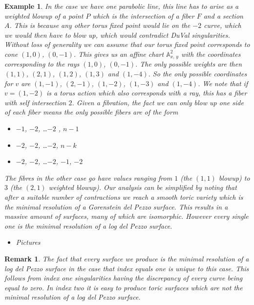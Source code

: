 \documentclass[11pt]{amsart}
\theoremstyle{plain}
\newtheorem{ex}[thm]{Example}
\newtheorem*{rem}{Remark}
\newcommand{\mb}[1]{\mathbb{#1}}
\begin{document}
\begin{ex}
In the case we have one parabolic line, this line has to arise as a weighted blowup of a point $P$ which is the intersection of a fiber $F$ and a section $A$. This is because any other torus fixed point would lie on the $-2$ curve, which we would then have to blow up, which would contradict DuVal singularities. Without loss of generality we can assume that our torus fixed point corresponds to cone $(1,0)$, $(0, -1)$. This gives us an affine chart $\mb{A}^2_{x, \, y}$ with the coordinates corresponding to the rays $(1,0)$, $(0, -1)$. The only possible weights are then $(1,1)$, $(2,1)$, $(1,2)$, $(1,3)$ and $(1,-4)$. So the only possible coordinates for $v$ are $(1, -1)$, $(2, -1)$, $(1, -2)$, $(1, -3)$ and $(1,-4)$. We note that if $v = (1,-2)$ is a torus action which also corresponds with a ray, this has a fiber with self intersection $2$. Given a fibration, the fact we can only blow up one side of each fiber means the only possible fibers are of the form 

\begin{itemize}
\item $-1$, $-2$, \dots $-2$ , $n-1$
\item $-2$, $-2$, \dots $-2$, $n-k$
\item $-2$, $-2$, \dots $-2$, $-1$, $-2$

\end{itemize}

The fibres in the other case go have values ranging from $1$ (the $(1,1)$ blowup) to $3$ (the $(2,1)$ weighted blowup). Our analysis can be simplified by noting that after a suitable number of contractions we reach a smooth toric variety which is the minimal resolution of a Gorenstein del Pezzo surface. This results in a massive amount of surfaces, many of which are isomorphic.
However every single one is the minimal resolution of a log del Pezzo surface.

\begin{itemize}
\item Pictures
\end{itemize}

\end{ex}

\begin{rem}
The fact that every surface we produce is the minimal resolution of a log del Pezzo surface in the case that index equals one is unique to this case. This follows from index one singularities having the discrepancy of every curve being equal to zero. In index two it is easy to produce toric surfaces which are not the minimal resolution of a log del Pezzo surface.
\end{rem}
\end{document}
